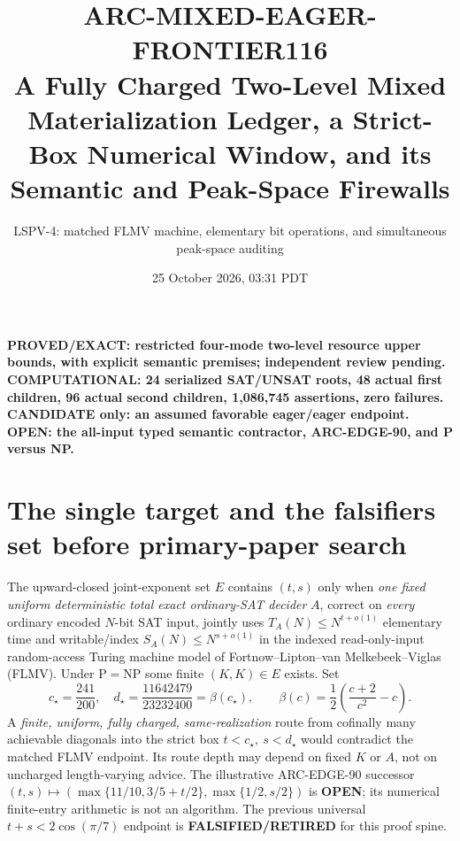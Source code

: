 \documentclass[11pt]{article}
\title{ARC-MIXED-EAGER-FRONTIER116\\
\large A Fully Charged Two-Level Mixed Materialization Ledger,
a Strict-Box Numerical Window, and its Semantic and Peak-Space Firewalls}
\author{LSPV-4: matched FLMV machine, elementary bit operations, and simultaneous peak-space auditing}
\date{25 October 2026, 03:31 PDT}
\newcommand{\OPEN}{\textbf{OPEN}}
\begin{document}
\maketitle
\begin{center}
\textbf{PROVED/EXACT: restricted four-mode two-level resource upper bounds, with explicit semantic premises; independent review pending.}\\
\textbf{COMPUTATIONAL: 24 serialized SAT/UNSAT roots, 48 actual first children,
96 actual second children, 1,086,745 assertions, zero failures.}\\
\textbf{CANDIDATE only: an assumed favorable eager/eager endpoint.}\\
\textbf{OPEN: the all-input typed semantic contractor, ARC-EDGE-90, and P versus NP.}
\end{center}

\section*{The single target and the falsifiers set before primary-paper search}
The upward-closed joint-exponent set $E$ contains $(t,s)$ only when
\emph{one fixed uniform deterministic total exact ordinary-SAT decider}
$A$, correct on \emph{every} ordinary encoded $N$-bit SAT input, jointly
uses $T_A(N)\le N^{t+o(1)}$ elementary time and writable/index
$S_A(N)\le N^{s+o(1)}$ in the indexed read-only-input random-access
Turing machine model of Fortnow--Lipton--van Melkebeek--Viglas (FLMV).
Under $\mathrm{P}=\mathrm{NP}$ some finite $(K,K)\in E$ exists.
Set
\[
 c_\star=\frac{241}{200},\quad
 d_\star=\frac{11642479}{23232400}=\beta(c_\star),\qquad
 \beta(c)=\frac12\left(\frac{c+2}{c^2}-c\right).
\]
A \emph{finite, uniform, fully charged, same-realization} route from
cofinally many achievable diagonals into the strict box
$t<c_\star,\ s<d_\star$ would contradict the matched FLMV endpoint.
Its route depth may depend on fixed $K$ or $A$, not on uncharged
length-varying advice. The illustrative ARC-EDGE-90 successor
$(t,s)\mapsto(\max\{11/10,3/5+t/2\},\max\{1/2,s/2\})$
is \OPEN; its numerical finite-entry arithmetic is not an algorithm.
The previous universal $t+s<2\cos(\pi/7)$ endpoint is
\textbf{FALSIFIED/RETIRED} for this proof spine.
\end{document}

